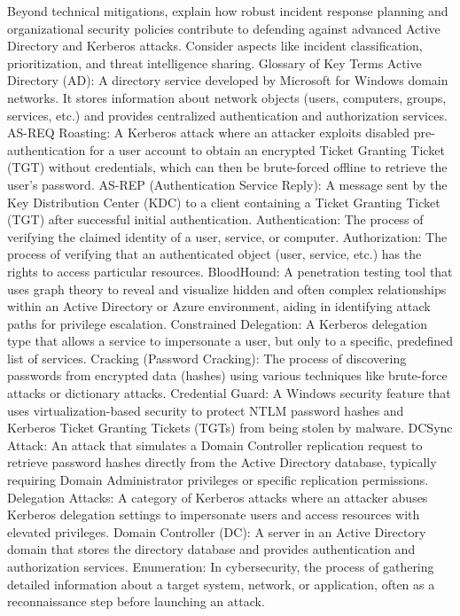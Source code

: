 Beyond technical mitigations, explain how robust incident response planning and organizational security policies contribute to defending against advanced Active Directory and Kerberos attacks. Consider aspects like incident classification, prioritization, and threat intelligence sharing.
Glossary of Key Terms
Active Directory (AD): A directory service developed by Microsoft for Windows domain networks. It stores information about network objects (users, computers, groups, services, etc.) and provides centralized authentication and authorization services.
AS-REQ Roasting: A Kerberos attack where an attacker exploits disabled pre-authentication for a user account to obtain an encrypted Ticket Granting Ticket (TGT) without credentials, which can then be brute-forced offline to retrieve the user's password.
AS-REP (Authentication Service Reply): A message sent by the Key Distribution Center (KDC) to a client containing a Ticket Granting Ticket (TGT) after successful initial authentication.
Authentication: The process of verifying the claimed identity of a user, service, or computer.
Authorization: The process of verifying that an authenticated object (user, service, etc.) has the rights to access particular resources.
BloodHound: A penetration testing tool that uses graph theory to reveal and visualize hidden and often complex relationships within an Active Directory or Azure environment, aiding in identifying attack paths for privilege escalation.
Constrained Delegation: A Kerberos delegation type that allows a service to impersonate a user, but only to a specific, predefined list of services.
Cracking (Password Cracking): The process of discovering passwords from encrypted data (hashes) using various techniques like brute-force attacks or dictionary attacks.
Credential Guard: A Windows security feature that uses virtualization-based security to protect NTLM password hashes and Kerberos Ticket Granting Tickets (TGTs) from being stolen by malware.
DCSync Attack: An attack that simulates a Domain Controller replication request to retrieve password hashes directly from the Active Directory database, typically requiring Domain Administrator privileges or specific replication permissions.
Delegation Attacks: A category of Kerberos attacks where an attacker abuses Kerberos delegation settings to impersonate users and access resources with elevated privileges.
Domain Controller (DC): A server in an Active Directory domain that stores the directory database and provides authentication and authorization services.
Enumeration: In cybersecurity, the process of gathering detailed information about a target system, network, or application, often as a reconnaissance step before launching an attack.
